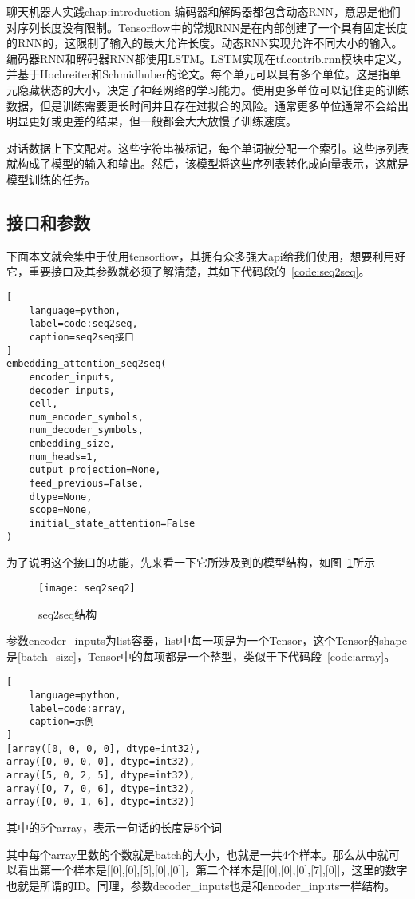 \begin{cuzchapter}{聊天机器人实践}{chap:introduction}
编码器和解码器都包含动态RNN，意思是他们对序列长度没有限制。Tensorflow中的常规RNN是在内部创建了一个具有固定长度的RNN的，这限制了输入的最大允许长度。动态RNN实现允许不同大小的输入。编码器RNN和解码器RNN都使用LSTM。LSTM实现在tf.contrib.rnn模块中定义，并基于Hochreiter和Schmidhuber的论文\cite{Graves2012Long}。每个单元可以具有多个单位。这是指单元隐藏状态的大小，决定了神经网络的学习能力。使用更多单位可以记住更的训练数据，但是训练需要更长时间并且存在过拟合的风险。通常更多单位通常不会给出明显更好或更差的结果，但一般都会大大放慢了训练速度。

对话数据上下文配对。这些字符串被标记，每个单词被分配一个索引。这些序列表就构成了模型的输入和输出。然后，该模型将这些序列表转化成向量表示，这就是模型训练的任务。
\subsection{接口和参数}\label{sec:background}
下面本文就会集中于使用tensorflow，其拥有众多强大api给我们使用，想要利用好它，重要接口及其参数就必须了解清楚，其如下代码段的~\ref{code:seq2seq}。
\begin{lstlisting}[
    language=python,
    label=code:seq2seq,
    caption=seq2seq接口
]
embedding_attention_seq2seq(
    encoder_inputs,
    decoder_inputs,
    cell,
    num_encoder_symbols,
    num_decoder_symbols,
    embedding_size,
    num_heads=1,
    output_projection=None,
    feed_previous=False,
    dtype=None,
    scope=None,
    initial_state_attention=False
)
\end{lstlisting}

为了说明这个接口的功能，先来看一下它所涉及到的模型结构，如图~\ref{seq2seq2}所示
\begin{figure}[!htbp]
    \centering
    \texttt{[image: seq2seq2]}
    \caption[seq2seq2]{seq2seq结构}
    \label{seq2seq2}
\end{figure}

参数encoder\_inputs为list容器，list中每一项是为一个Tensor，这个Tensor的shape是[batch\_size]，Tensor中的每项都是一个整型，类似于下代码段~\ref{code:array}。
\begin{lstlisting}[
    language=python,
    label=code:array,
    caption=示例
]
[array([0, 0, 0, 0], dtype=int32), 
array([0, 0, 0, 0], dtype=int32), 
array([5, 0, 2, 5], dtype=int32), 
array([0, 7, 0, 6], dtype=int32), 
array([0, 0, 1, 6], dtype=int32)]
\end{lstlisting}
其中的5个array，表示一句话的长度是5个词

其中每个array里数的个数就是batch的大小，也就是一共4个样本。那么从中就可以看出第一个样本是[[0],[0],[5],[0],[0]]，第二个样本是[[0],[0],[0],[7],[0]]，这里的数字也就是所谓的ID。同理，参数decoder\_inputs也是和encoder\_inputs一样结构。


\end{cuzchapter}
